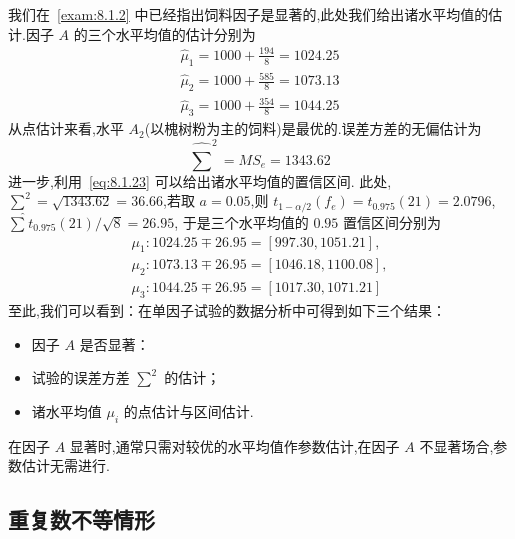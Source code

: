 \begin{example}
我们在~\ref{exam:8.1.2} 中已经指出饲料因子是显著的,此处我们给出诸水平均值的估计.因子 $A$ 的三个水平均值的估计分别为
  \begin{gather*} \hat{\mu}_{1} =1000+\frac{194}{8}=1024.25 \\ 
    \hat{\mu}_{2} =1000+\frac{585}{8}=1073.13 \\ 
    \hat{\mu}_{3} =1000+\frac{354}{8}=1044.25 
  \end{gather*}
从点估计来看,水平 $A_2$(以槐树粉为主的饲料)是最优的.误差方差的无偏估计为
\begin{equation*}
  \hat{\sum}^{2}=M S_{e}=1343.62
\end{equation*}
进一步,利用~\ref{eq:8.1.23} 可以给出诸水平均值的置信区间. 此处,$\sum^2=\sqrt{1343.62}=
36.66$,若取 $a=0.05$,则 $t_{1-\alpha/2} (f_e)=t_{0.975}(21)=2.0796$, $\hat{\sum} t_{0.975}(21)/\sqrt{8}=26.95$, 于是三个水平均值的 $0.95$ 置信区间分别为
\begin{gather*}
  \mu_{1} : 1024.25 \mp 26.95 = [997.30, 1051.21],\\
  \mu_{2} : 1073.13 \mp 26.95=[1046.18,1100.08],\\
  \mu_{3} : 1044.25 \mp 26.95=[1017.30,1071.21]
\end{gather*}
至此,我们可以看到：在单因子试验的数据分析中可得到如下三个结果：
\begin{itemize}
  \item 因子 $A$ 是否显著：
  \item 试验的误差方差 $\sum^2$ 的估计；
  \item 诸水平均值 $\mu_i$ 的点估计与区间估计.
\end{itemize}

在因子 $A$ 显著时,通常只需对较优的水平均值作参数估计,在因子 $A$ 不显著场合,参数估计无需进行.
\end{example}
\subsection{重复数不等情形}

